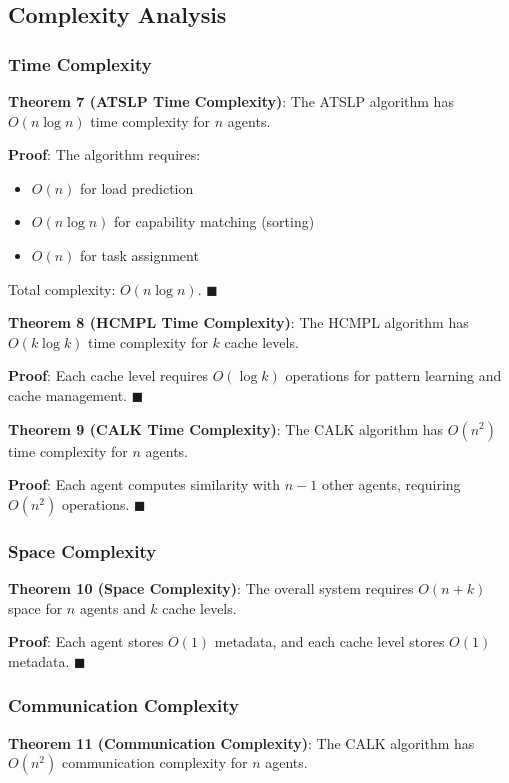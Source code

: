 \documentclass[conference]{IEEEtran}
\begin{document}
\subsection{Complexity Analysis}

\subsubsection{Time Complexity}

\textbf{Theorem 7 (ATSLP Time Complexity)}: The ATSLP algorithm has $O(n \log n)$ time complexity for $n$ agents.

\textbf{Proof}: The algorithm requires:
\begin{itemize}
\item $O(n)$ for load prediction
\item $O(n \log n)$ for capability matching (sorting)
\item $O(n)$ for task assignment
\end{itemize}
Total complexity: $O(n \log n)$. $\blacksquare$

\textbf{Theorem 8 (HCMPL Time Complexity)}: The HCMPL algorithm has $O(k \log k)$ time complexity for $k$ cache levels.

\textbf{Proof}: Each cache level requires $O(\log k)$ operations for pattern learning and cache management. $\blacksquare$

\textbf{Theorem 9 (CALK Time Complexity)}: The CALK algorithm has $O(n^2)$ time complexity for $n$ agents.

\textbf{Proof}: Each agent computes similarity with $n-1$ other agents, requiring $O(n^2)$ operations. $\blacksquare$

\subsubsection{Space Complexity}

\textbf{Theorem 10 (Space Complexity)}: The overall system requires $O(n + k)$ space for $n$ agents and $k$ cache levels.

\textbf{Proof}: Each agent stores $O(1)$ metadata, and each cache level stores $O(1)$ metadata. $\blacksquare$

\subsubsection{Communication Complexity}

\textbf{Theorem 11 (Communication Complexity)}: The CALK algorithm has $O(n^2)$ communication complexity for $n$ agents.
\end{document}
